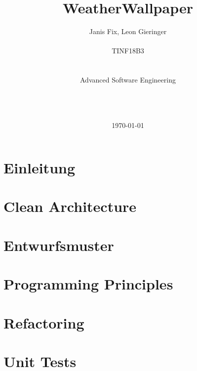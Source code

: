 \documentclass[11pt,a4paper]{article}
\title{WeatherWallpaper\vspace{20px}}
\author{Janis Fix, Leon Gieringer \\ \\ TINF18B3 \\ \\ \\ Advanced Software Engineering \\ \\ \\ \\}
\date{\today}
\begin{document}
	\maketitle
	\thispagestyle{empty}
	\newpage
	
	\tableofcontents
	\newpage
	\listoflistings
	\newpage
	
	
	\pagestyle{fancy}
	\fancyhf{}
	\setlength{\headheight}{35pt}
	\cfoot{\thepage}
	\newpage
	
	
	\section{Einleitung}
	
	\newpage
	
	\section{Clean Architecture}
	\label{sec:clean_architecture}
	
	\newpage
	\section{Entwurfsmuster}
	
	\newpage
	\section{Programming Principles}
	
	\newpage
	\section{Refactoring}
	
	\newpage
	\section{Unit Tests}
	
	
	
	
	
\end{document}
